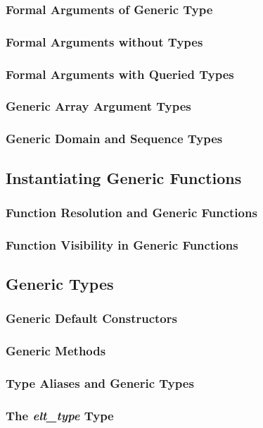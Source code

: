 \documentclass[10pt,twoside,titlepage]{article}
\begin{document}
\subsubsection{Formal Arguments of Generic Type}
\subsubsection{Formal Arguments without Types}
\subsubsection{Formal Arguments with Queried Types}
\subsubsection{Generic Array Argument Types}
\subsubsection{Generic Domain and Sequence Types}
\subsection{Instantiating Generic Functions}
\subsubsection{Function Resolution and Generic Functions}
\subsubsection{Function Visibility in Generic Functions}
\subsection{Generic Types}
\subsubsection{Generic Default Constructors}
\subsubsection{Generic Methods}
\subsubsection{Type Aliases and Generic Types}
\subsubsection{The {\em elt\_type} Type}
\end{document}
